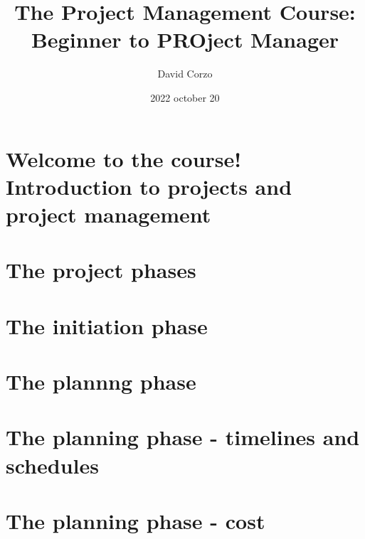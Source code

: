 \documentclass[openany]{book}
\title{The Project Management Course: Beginner to PROject Manager}
\date{2022 october 20}
\author{David Corzo}
\begin{document}
\maketitle
\tableofcontents

\chapter{Welcome to the course! Introduction to projects and project management}


\chapter{The project phases}


\chapter{The initiation phase}


\chapter{The plannng phase}


\chapter{The planning phase - timelines and schedules}


\chapter{The planning phase - cost}


\end{document}
